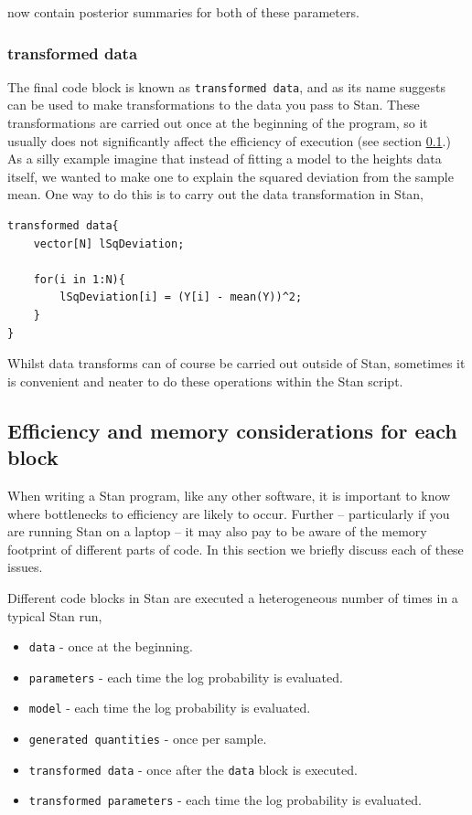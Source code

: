 \documentclass[11pt,fullpage]{book}
\begin{document}
now contain posterior summaries for both of these parameters.

\subsubsection{transformed data}
The final code block is known as \texttt{transformed data}, and as its name suggests can be used to make transformations to the data you pass to Stan. These transformations are carried out once at the beginning of the program, so it usually does not significantly affect the efficiency of execution (see section \ref{sec:StanJags_efficiency}.) As a silly example imagine that instead of fitting a model to the heights data itself, we wanted to make one to explain the squared deviation from the sample mean. One way to do this is to carry out the data transformation in Stan,

\begin{verbatim}
transformed data{
    vector[N] lSqDeviation;
    
    for(i in 1:N){
	    lSqDeviation[i] = (Y[i] - mean(Y))^2;
    }
}
\end{verbatim}
Whilst data transforms can of course be carried out outside of Stan, sometimes it is convenient and neater to do these operations within the Stan script.

\subsection{Efficiency and memory considerations for each block}\label{sec:StanJags_efficiency}
When writing a Stan program, like any other software, it is important to know where bottlenecks to efficiency are likely to occur. Further -- particularly if you are running Stan on a laptop -- it may also pay to be aware of the memory footprint of different parts of code. In this section we briefly discuss each of these issues.

Different code blocks in Stan are executed a heterogeneous number of times in a typical Stan run,

\begin{itemize}
\item \texttt{data} - once at the beginning.
\item \texttt{parameters} - each time the log probability is evaluated.
\item \texttt{model} - each time the log probability is evaluated.
\item \texttt{generated quantities} - once per sample.
\item \texttt{transformed data} - once after the \texttt{data} block is executed.
\item \texttt{transformed parameters} - each time the log probability is evaluated.
\end{itemize} 
\end{document}
